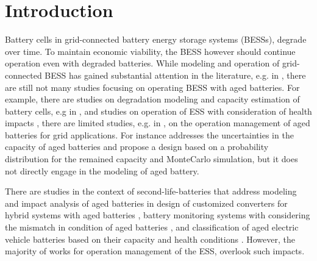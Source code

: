 \documentclass[10pt,twocolumn]{IEEEtran}
\begin{document}


\section{Introduction}

%
%
%
Battery cells  in grid-connected battery energy storage systems (BESSs), degrade  over time.
To maintain economic viability, the BESS however should continue operation even with  degraded batteries.
While  modeling and operation  of grid-connected BESS has gained substantial attention in the literature, e.g. in \cite{8663451, 8003332}, there are still not  many studies focusing on operating BESS with  aged batteries.  
For example,  there are  studies on degradation modeling and capacity estimation of battery cells, e.g in \cite{rong2006analytical,  roscher2011detection, martinez2016evaluation, goebel2008prognostics},  and  studies on operation of ESS with consideration of health impacts \cite{MASIHTEHRANI20132, 7588052, 7428105}, there are limited studies, e.g. in \cite{saez2015second, keeli2012optimal},  on the operation management of aged batteries for grid applications. For instance \cite{keeli2012optimal} addresses  the uncertainties in the capacity of aged batteries and propose a design based on a probability distribution for the remained capacity and  MonteCarlo simulation,  but  it does not directly engage in the modeling of aged battery.

There are studies in the context of second-life-batteries that address modeling and impact analysis of aged batteries in design of customized converters for hybrid systems with aged batteries \cite{6861989}, battery monitoring systems with considering the mismatch in condition of aged  batteries \cite{tong2017demonstration}, and classification of aged electric vehicle batteries based on their capacity and health conditions \cite{liao2017performance}. However, the majority of works for operation management of the ESS, overlook such impacts.
\end{document}
